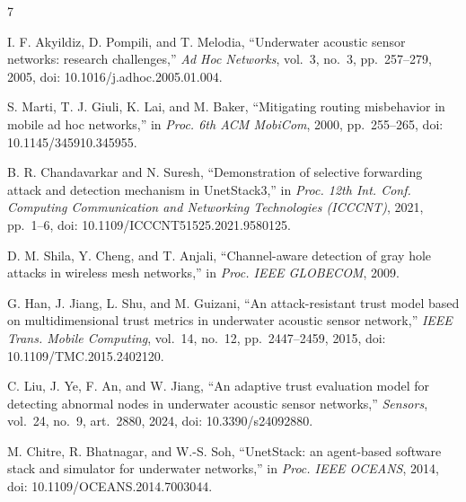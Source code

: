 \documentclass{article}
\begin{document}
\begin{thebibliography}{7}
\raggedright

 I. F. Akyildiz, D. Pompili, and T. Melodia, ``Underwater acoustic sensor networks: research challenges,'' \emph{Ad Hoc Networks}, vol.~3, no.~3, pp.~257--279, 2005, doi: 10.1016/j.adhoc.2005.01.004.

 S. Marti, T. J. Giuli, K. Lai, and M. Baker, ``Mitigating routing misbehavior in mobile ad hoc networks,'' in \emph{Proc. 6th ACM MobiCom}, 2000, pp.~255--265, doi: 10.1145/345910.345955.

 B. R. Chandavarkar and N. Suresh, ``Demonstration of selective forwarding attack and detection mechanism in UnetStack3,'' in \emph{Proc. 12th Int. Conf. Computing Communication and Networking Technologies (ICCCNT)}, 2021, pp.~1--6, doi: 10.1109/ICCCNT51525.2021.9580125.

 D. M. Shila, Y. Cheng, and T. Anjali, ``Channel-aware detection of gray hole attacks in wireless mesh networks,'' in \emph{Proc. IEEE GLOBECOM}, 2009.

 G. Han, J. Jiang, L. Shu, and M. Guizani, ``An attack-resistant trust model based on multidimensional trust metrics in underwater acoustic sensor network,'' \emph{IEEE Trans. Mobile Computing}, vol.~14, no.~12, pp.~2447--2459, 2015, doi: 10.1109/TMC.2015.2402120.

 C. Liu, J. Ye, F. An, and W. Jiang, ``An adaptive trust evaluation model for detecting abnormal nodes in underwater acoustic sensor networks,'' \emph{Sensors}, vol.~24, no.~9, art.~2880, 2024, doi: 10.3390/s24092880.

 M. Chitre, R. Bhatnagar, and W.-S. Soh, ``UnetStack: an agent-based software stack and simulator for underwater networks,'' in \emph{Proc. IEEE OCEANS}, 2014, doi: 10.1109/OCEANS.2014.7003044.

\end{thebibliography}
\end{document}
